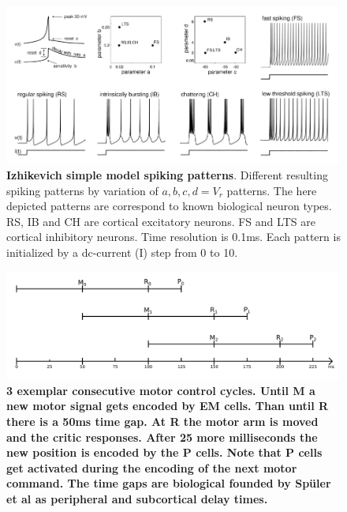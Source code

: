 \begin{figure}
	\centering
	\includegraphics[width=0.7\linewidth]{figures/ModelSebastian/SpikingPatterns}
	\caption[Izhikevich simple \cite{izhikevichSimpleModel} model spiking patterns]{\textbf{Izhikevich simple model \cite{izhikevichSimpleModel} spiking patterns}. Different resulting spiking patterns by variation of $a,b,c,d=V_r$ patterns. The here depicted patterns are correspond to known biological neuron types. RS, IB and CH are cortical excitatory neurons. FS and LTS are cortical inhibitory neurons. Time resolution is 0.1ms. Each pattern is initialized by a dc-current (I) step from 0 to 10. \cite{izhikevichSimpleModel}}  %
	\label{fig:spikingpatterns}
\end{figure}

\begin{figure}
	\centering
	\includegraphics[width=0.7\linewidth]{figures/ModelSebastian/timing}
	\caption[Motor Control cycles]{\textbf{3 exemplar consecutive motor control cycles. Until M a new motor signal gets encoded by EM cells. Than until R there is a 50ms time gap. At R the motor arm is moved and the critic responses. After 25 more milliseconds the new position is encoded by the P cells. Note that P cells get activated during the encoding of the next motor command. The time gaps are biological founded by Spüler et al as peripheral and subcortical delay times.}}
	\label{fig:timing}
\end{figure}

